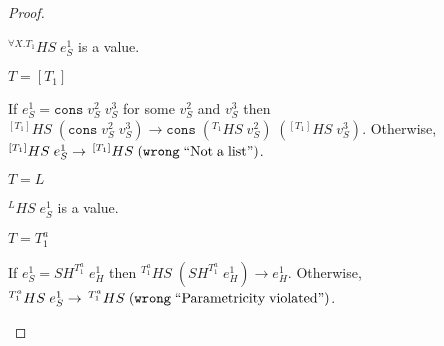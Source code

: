 \begin{hps}
\begin{proof}
\begin{hps-case-14}
\begin{hps-case-14-3}
$^{\forall X.T_{1}}HS\;e_{S}^{1}$ is a value.
\end{hps-case-14-3}
\begin{hps-case-14-4}
$T=[T_{1}]$

If $e_{S}^{1}=\mathtt{cons}\;v_{S}^{2}\;v_{S}^{3}$ for some $v_{S}^{2}$ and $v_{S}^{3}$ then $^{[T_{1}]}HS\;(\mathtt{cons}\;v_{S}^{2}\;v_{S}^{3})\rightarrow\mathtt{cons}\;(^{T_{1}}HS\;v_{S}^{2})\;(^{[T_{1}]}HS\;v_{S}^{3})$.  Otherwise, $^{[T_{1}]}HS\;e_{S}^{1}\rightarrow\,^{[T_{1}]}HS\;(\mathtt{wrong}\;\mathrm{``Not\;a\;list"})$.
\end{hps-case-14-4}
\begin{hps-case-14-5}
$T=L$

$^{L}HS\;e_{S}^{1}$ is a value.
\end{hps-case-14-5}
\begin{hps-case-14-6}
$T=T_{1}^{a}$

If $e_{S}^{1}=SH^{T_{1}^{a}}\;e_{H}^{1}$ then $^{T_{1}^{a}}HS\;(SH^{T_{1}^{a}}\;e_{H}^{1})\rightarrow e_{H}^{1}$.  Otherwise, $^{T_{1}^{a}}HS\;e_{S}^{1}\rightarrow\,^{T_{1}^{a}}HS\;(\mathtt{wrong}\;\mathrm{``Parametricity\;violated"})$.
\end{hps-case-14-6}
\end{hps-case-14}
\end{proof}
\end{hps}